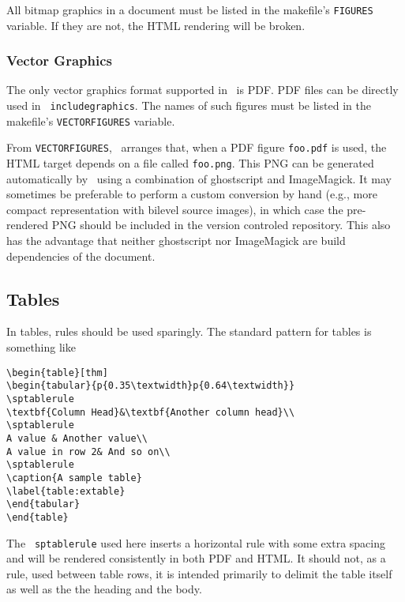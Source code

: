 \documentclass[11pt,a4paper]{ivoa}
\newcommand{\texword}[1]{\texttt{\color{texcolor} #1}}
\begin{document}
All bitmap graphics in a document must  be listed in the makefile's
\texttt{FIGURES} variable.  If they are not, the HTML rendering will be
broken.

\subsubsection{Vector Graphics}
\label{sect:vectorgraphics}

The only vector graphics format supported in \ivoatex\ is PDF.  PDF
files can be directly used in \texword{includegraphics}.  The names of
such figures must be listed in the makefile's \texttt{VECTORFIGURES}
variable.

From \texttt{VECTORFIGURES}, \ivoatex\ arranges that, when a PDF figure 
\texttt{foo.pdf} is used, the HTML target depends on a file called
\texttt{foo.png}.  This PNG can be generated automatically by
\ivoatex\ using a combination of ghostscript and ImageMagick.  It may
sometimes be preferable to perform a custom conversion by hand (e.g.,
more compact representation with bilevel source images), in which case
the pre-rendered PNG should be included in the version controled
repository.  This also
has the advantage that neither ghostscript nor ImageMagick are build
dependencies of the document.

\subsection{Tables}

In tables, rules should be used sparingly.  The standard pattern for tables is
something like
\begin{lstlisting}
\begin{table}[thm]
\begin{tabular}{p{0.35\textwidth}p{0.64\textwidth}}
\sptablerule
\textbf{Column Head}&\textbf{Another column head}\\
\sptablerule
A value & Another value\\
A value in row 2& And so on\\
\sptablerule
\caption{A sample table}
\label{table:extable}
\end{tabular}
\end{table}
\end{lstlisting}

The \texword{sptablerule} used here inserts a horizontal rule with some
extra spacing and will be rendered consistently in both PDF and HTML.
It should not, as a rule, used between table rows, it is intended
primarily to delimit the table itself as well as the the heading and the
body.
\end{document}
